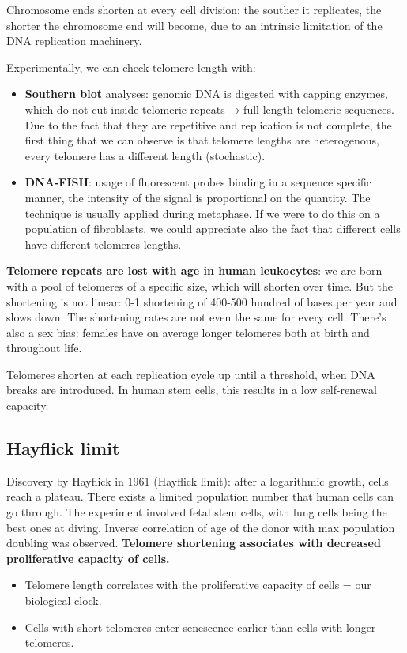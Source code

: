 Chromosome ends shorten at every cell division: the souther it
replicates, the shorter the chromosome end will become, due to an
intrinsic limitation of the DNA replication machinery.

Experimentally, we can check telomere length with:
\begin{itemize}
\tightlist
\item
  \textbf{Southern blot} analyses: genomic DNA is digested with capping
  enzymes, which do not cut inside telomeric repeats → full length
  telomeric sequences. Due to the fact that they are repetitive and
  replication is not complete, the first thing that we can observe is
  that telomere lengths are heterogenous, every telomere has a different
  length (stochastic).
\item
  \textbf{DNA-FISH}: usage of fluorescent probes binding in a sequence
  specific manner, the intensity of the signal is proportional on the
  quantity. The technique is usually applied during metaphase. If we
  were to do this on a population of fibroblasts, we could appreciate
  also the fact that different cells have different telomeres lengths.
\end{itemize}

\textbf{Telomere repeats are lost with age in human leukocytes}: we are
born with a pool of telomeres of a specific size, which will shorten
over time. But the shortening is not linear: 0-1 shortening of 400-500
hundred of bases per year and slows down. The shortening rates are not
even the same for every cell. There's also a sex bias: females have on
average longer telomeres both at birth and throughout life.

Telomeres shorten at each replication cycle up until a threshold, when
DNA breaks are introduced. In human stem cells, this results in a low
self-renewal capacity.

\hypertarget{hayflick-limit}{%
\subsection{Hayflick limit}\label{hayflick-limit}}

Discovery by Hayflick in 1961 (Hayflick limit): after a logarithmic
growth, cells reach a plateau. There exists a limited population number
that human cells can go through. The experiment involved fetal stem
cells, with lung cells being the best ones at diving. Inverse
correlation of age of the donor with max population doubling was
observed. \textbf{Telomere shortening associates with decreased
proliferative capacity of cells.}
\begin{itemize}
\tightlist
\item
  Telomere length correlates with the proliferative capacity of cells =
  our biological clock.
\item
  Cells with short telomeres enter senescence earlier than cells with
  longer telomeres.
\end{itemize}

